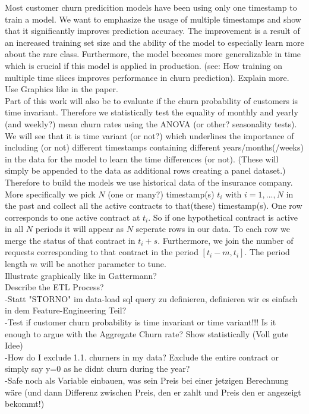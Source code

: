 \documentclass[12pt,titlepage]{article}
\begin{document}
Most customer churn predicition models have been using only one timestamp to train a model. We want to emphasize the usage of multiple timestamps and
show that it significantly improves prediction accuracy. The improvement is a result of an increased training set size and the ability of the model to
especially learn more about the rare class. Furthermore, the model becomes more generalizable in time which is crucial if this model is applied in
production. (see: How training on multiple time slices improves performance in churn prediction). Explain more. Use Graphics like in the paper.\\
Part of this work will also be to evaluate if the churn probability of customers is time invariant. Therefore we statistically test the equality of
monthly and yearly (and weekly?) mean churn rates using the ANOVA (or other? seasonality tests). We will see that it is time variant (or not?) which underlines the
importance of including (or not) different timestamps containing different years/months(/weeks) in the data for the model to learn the time differences
(or not). (These will simply be appended to the data as additional rows creating a panel dataset.) \\
Therefore to build the models we use historical data of the insurance company. More specifically we pick $N$ (one or many?) timestamp(s) $t_{i}$ with
$i = 1,...,N$ in the past and collect all the active contracts to that(these) timestamp(s). One row corresponds to one active contract at $t_{i}$. So
if one hypothetical contract is active in all $N$ periods it will appear as $N$ seperate rows in our data. To each row we merge the status of that
contract in $t_{i}+s$. Furthermore, we join the number of requests corresponding to that contract in the period $[t_{i}-m, t_{i}]$. The period length $m$
will be another parameter to tune. \\
Illustrate graphically like in Gattermann? \\
Describe the ETL Process? \\

-Statt "STORNO" im data-load sql query zu definieren, definieren wir es einfach in dem Feature-Engineering Teil?\\
-Test if customer churn probability is time invariant or time variant!!! Is it enough to argue with the Aggregate Churn rate? Show statistically (Voll gute Idee)\\
-How do I exclude 1.1. churners in my data? Exclude the entire contract or simply say y=0 as he didnt churn during the year?\\
-Safe noch als Variable einbauen, was sein Preis bei einer jetzigen Berechnung wäre (und dann Differenz zwischen Preis, den er zahlt und Preis den er angezeigt bekommt!)\\
\end{document}
